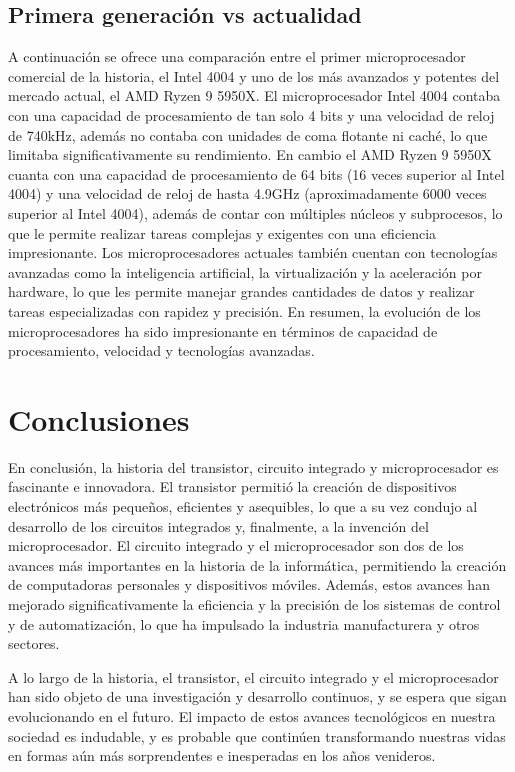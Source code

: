 \documentclass{article}
\begin{document}
\subsection*{Primera generación vs actualidad}
A continuación se ofrece una comparación entre el primer microprocesador comercial de la historia, 
el Intel 4004 y uno de los más avanzados y potentes del mercado actual, el AMD Ryzen 9 5950X. 
El microprocesador Intel 4004 contaba con una capacidad de procesamiento de tan solo 4 bits y una 
velocidad de reloj de 740kHz, además no contaba con unidades de coma flotante ni caché, lo que limitaba 
significativamente su rendimiento. En cambio el AMD Ryzen 9 5950X cuanta con una capacidad de procesamiento
de 64 bits (16 veces superior al Intel 4004) y una velocidad de reloj de hasta 4.9GHz (aproximadamente 6000 veces superior 
al Intel 4004), además de contar con múltiples núcleos y subprocesos, lo que le permite realizar tareas complejas 
y exigentes con una eficiencia impresionante. Los microprocesadores actuales también cuentan con tecnologías avanzadas 
como la inteligencia artificial, la virtualización y la aceleración por hardware, lo que les permite manejar 
grandes cantidades de datos y realizar tareas especializadas con rapidez y precisión. En resumen, la evolución de 
los microprocesadores ha sido impresionante en términos de capacidad de procesamiento, velocidad y tecnologías avanzadas.


\newpage
\section*{Conclusiones}

En conclusión, la historia del transistor, circuito integrado y microprocesador es fascinante e innovadora.  
El transistor permitió la creación de dispositivos electrónicos más pequeños, eficientes y asequibles, 
lo que a su vez condujo al desarrollo de los circuitos integrados y, finalmente, a la invención del microprocesador.
El circuito integrado y el microprocesador son dos de los avances más importantes en la historia de la informática, 
permitiendo la creación de computadoras personales y dispositivos móviles. Además, estos avances han mejorado 
significativamente la eficiencia y la precisión de los sistemas de control y de automatización, lo que ha 
impulsado la industria manufacturera y otros sectores.

A lo largo de la historia, el transistor, el circuito integrado y el microprocesador han sido objeto de una investigación 
y desarrollo continuos, y se espera que sigan evolucionando en el futuro. El impacto de estos avances tecnológicos 
en nuestra sociedad es indudable, y es probable que continúen transformando nuestras vidas 
en formas aún más sorprendentes e inesperadas en los años venideros.





\end{document}
